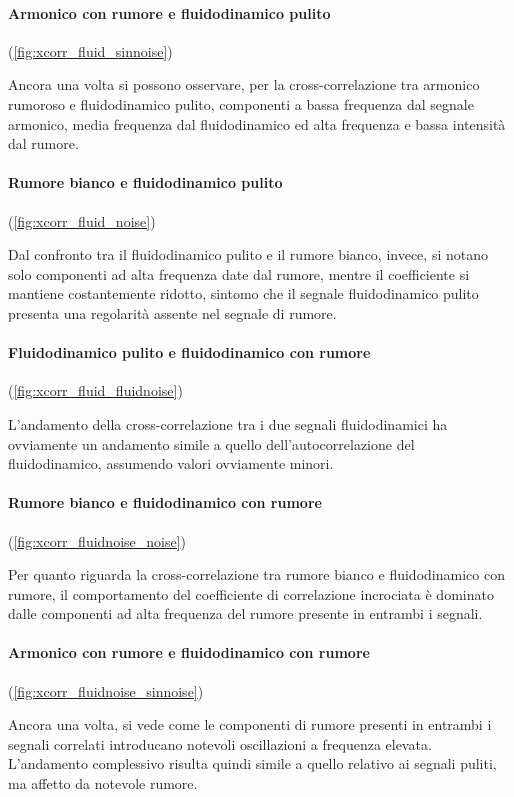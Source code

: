 \documentclass{article} %
\newcommand{\back}{$\!\!\!\!$}
\begin{document}
\paragraph{Armonico con rumore e fluidodinamico pulito}\back(\cref{fig:xcorr_fluid_sinnoise})\par
Ancora una volta si possono osservare, per la cross-correlazione tra armonico rumoroso e fluidodinamico pulito, componenti a bassa frequenza dal segnale armonico, media frequenza dal fluidodinamico ed alta frequenza e bassa intensità dal rumore.

\paragraph{Rumore bianco e fluidodinamico pulito}\back(\cref{fig:xcorr_fluid_noise})\par
Dal confronto tra il fluidodinamico pulito e il rumore bianco, invece, si notano solo componenti ad alta frequenza date dal rumore, mentre il coefficiente si mantiene costantemente ridotto, sintomo che il segnale fluidodinamico pulito presenta una regolarità assente nel segnale di rumore.

\paragraph{Fluidodinamico pulito e fluidodinamico con rumore}\back(\cref{fig:xcorr_fluid_fluidnoise})\par
L'andamento della cross-correlazione tra i due segnali fluidodinamici ha ovviamente un andamento simile a quello dell'autocorrelazione del fluidodinamico, assumendo valori ovviamente minori.

\paragraph{Rumore bianco e fluidodinamico con rumore}\back(\cref{fig:xcorr_fluidnoise_noise})\par
Per quanto riguarda la cross-correlazione tra rumore bianco e fluidodinamico con rumore, il comportamento del coefficiente di correlazione incrociata è dominato dalle componenti ad alta frequenza del rumore presente in entrambi i segnali.

\paragraph{Armonico con rumore e fluidodinamico con rumore}\back(\cref{fig:xcorr_fluidnoise_sinnoise})\par
Ancora una volta, si vede come le componenti di rumore presenti in entrambi i segnali correlati introducano notevoli oscillazioni a frequenza elevata. L'andamento complessivo risulta quindi simile a quello relativo ai segnali puliti, ma affetto da notevole rumore.
\end{document}
